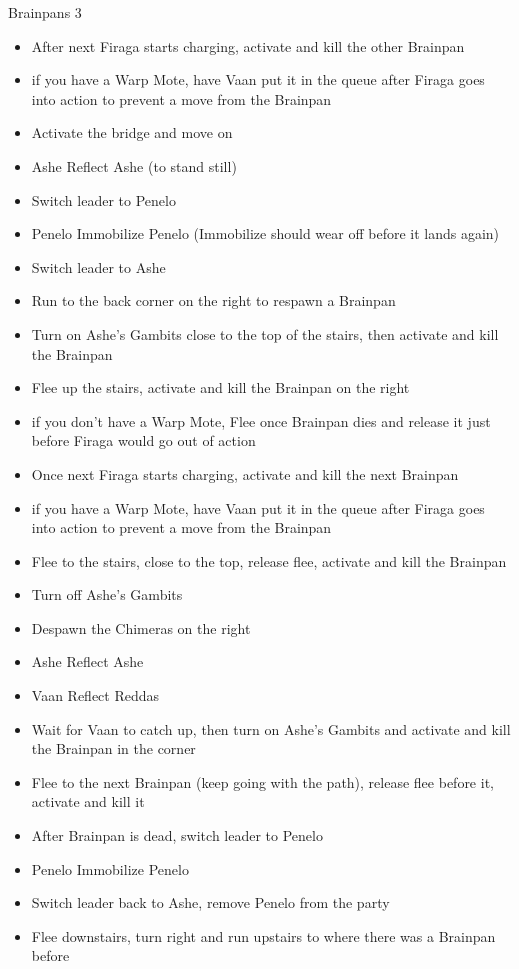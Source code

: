 \begin{battle}{Brainpans 3}
\begin{itemize}
		\item  After next Firaga starts charging, activate and kill the other Brainpan
		\item  if you have a Warp Mote, have Vaan put it in the queue after Firaga goes into action to prevent a move from the Brainpan
		\item  Activate the bridge and move on
		\item  Ashe Reflect Ashe (to stand still)
		\item  Switch leader to Penelo
		\item  Penelo Immobilize Penelo (Immobilize should wear off before it lands again)
		\item  Switch leader to Ashe
		\item  Run to the back corner on the right to respawn a Brainpan
		\item  Turn on Ashe's Gambits close to the top of the stairs, then activate and kill the Brainpan
		\item  Flee up the stairs, activate and kill the Brainpan on the right
		\item  if you don't have a Warp Mote, Flee once Brainpan dies and release it just before Firaga would go out of action
		\item  Once next Firaga starts charging, activate and kill the next Brainpan
		\item  if you have a Warp Mote, have Vaan put it in the queue after Firaga goes into action to prevent a move from the Brainpan
		\item  Flee to the stairs, close to the top, release flee, activate and kill the Brainpan
		\item  Turn off Ashe's Gambits
		\item  Despawn the Chimeras on the right
		\item  Ashe Reflect Ashe
		\item  Vaan Reflect Reddas
		\item  Wait for Vaan to catch up, then turn on Ashe's Gambits and activate and kill the Brainpan in the corner
		\item  Flee to the next Brainpan (keep going with the path), release flee before it, activate and kill it
		\item  After Brainpan is dead, switch leader to Penelo
		\item  Penelo Immobilize Penelo
		\item  Switch leader back to Ashe, remove Penelo from the party
		\item  Flee downstairs, turn right and run upstairs to where there was a Brainpan before

\end{itemize}
\end{battle}
